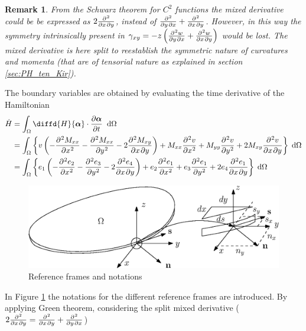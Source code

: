 \documentclass[preprint,12pt]{elsarticle}
\newtheorem{remark}{Remark}
\begin{document}
	\begin{remark}
		From the Schwarz theorem for $C^2$ functions the mixed derivative could be be expressed as $2 \diffp{}{x,y}$, instead of $\diffp{}{y,x} + \diffp{}{x,y}$. However, in this way the symmetry intrinsically present in $\gamma_{xy} = -z \left( \diffp{w}{y,x} + \diffp{w}{x,y} \right)$ would be lost. The mixed derivative is here split to reestablish the symmetric nature of curvatures and momenta (that are of tensorial nature as explained in section \ref{sec:PH_ten_Kir}).
	\end{remark}
	The boundary variables are obtained by evaluating the time derivative of the Hamiltonian
	\begin{align*}
	\dot{H} &= \int_\Omega \diffd{H}{\bm{\alpha}}   \cdot \diffp{\bm{\alpha}}{t} \; \d{\Omega} \\
	&= \int_\Omega \left\{ v \left(-\diffp[2]{M_{xx}}{x} -\diffp[2]{M_{xx}}{y} - 2 \diffp{M_{xy}}{x,y} \right) + M_{xx} \diffp[2]{v}{x} + M_{yy} \diffp[2]{v}{y} + 2 M_{xy} \diffp{v}{x,y} \right\} \d{\Omega} \\
	&= \int_\Omega \left\{ e_1 \left(-\diffp[2]{e_2}{x} -\diffp[2]{e_3}{y} - 2 \diffp{e_4}{x,y}\right) + e_2 \diffp[2]{e_1}{x} + e_3 \diffp[2]{e_1}{y} + 2 e_4 \diffp{e_1}{x,y}  \right\} \d{\Omega}
	\end{align*}
	
	\begin{figure}[t]
		\centering
		\includegraphics[height=0.2\textheight]{Plate_ref.eps}
		\caption{Reference frames and notations}
		\label{fig:plate_ref}
	\end{figure}
	
	In Figure \ref{fig:plate_ref} the notations for the different reference frames are introduced. By applying Green theorem, considering the split mixed derivative ($2 \diffp{}{x,y} = \diffp{}{x,y} +  \diffp{}{y,x}$)
	

\end{document}
